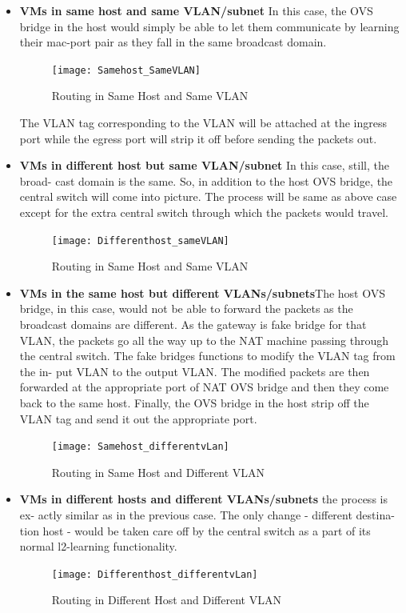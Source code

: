 \begin{itemize}
   
    \item \textbf{VMs in same host and same VLAN/subnet} In this case, the OVS bridge
in the host would simply be able to let them communicate by learning their
mac-port pair as they fall in the same broadcast domain. 

\begin{figure}[h]
\caption{Routing in Same Host and Same VLAN}
\centering
\texttt{[image: Samehost\_SameVLAN]}
\end{figure}

The VLAN
tag corresponding to the VLAN will be attached at the ingress port while
the egress port will strip it off before sending the packets out.


\pagebreak



     \item \textbf{VMs in different host but same VLAN/subnet} In this case, still, the broad-
cast domain is the same. So, in addition to the host OVS bridge, the
central switch will come into picture. The process will be same as above
case except for the extra central switch through which the packets would
travel.

\begin{figure}[h]
\caption{Routing in Same Host and Same VLAN}
\centering
\texttt{[image: Differenthost\_sameVLAN]}
\end{figure}

\pagebreak

      \item \textbf{VMs in the same host but different VLANs/subnets}The host OVS bridge,
in this case, would not be able to forward the packets as the broadcast
domains are different. As the gateway is fake bridge for that VLAN, the
packets go all the way up to the NAT machine passing through the central
switch. The fake bridges functions to modify the VLAN tag from the in-
put VLAN to the output VLAN. The modified packets are then forwarded
at the appropriate port of NAT OVS bridge and then they come back to
the same host. Finally, the OVS bridge in the host strip off the VLAN
tag and send it out the appropriate port.

\begin{figure}[h]
\caption{Routing in Same Host and Different VLAN}
\centering
\texttt{[image: Samehost\_differentvLan]}
\end{figure}

\newpage

\item \textbf{VMs in different hosts and different VLANs/subnets} the process is ex-
actly similar as in the previous case. The only change - different destina-
tion host - would be taken care off by the central switch as a part of its
normal l2-learning functionality.

\begin{figure}[h]
\caption{Routing in Different Host and Different VLAN}
\centering
\texttt{[image: Differenthost\_differentvLan]}
\end{figure}

\end{itemize}

